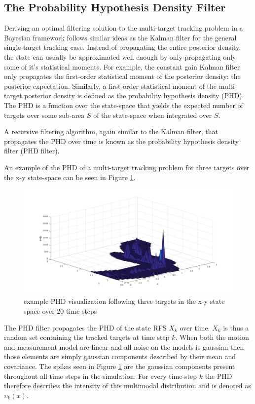 \subsection{The Probability Hypothesis Density Filter}

Deriving an optimal filtering solution to the multi-target tracking problem in a Bayesian framework follows similar ideas as the Kalman filter for the general single-target tracking case. Instead of propagating the entire posterior density, the state can usually be approximated well enough by only propagating only some of it's statistical moments. For example, the constant gain Kalman filter only propagates the first-order statistical moment of the posterior density: the posterior expectation. Similarly, a first-order statistical moment of the multi-target posterior density is defined as the probability hypothesis density (PHD). The PHD is a function over the state-space that yields the expected number of targets over some sub-area $S$ of the state-space when integrated over $S$.\cite{mahler2003multitarget}

A recursive filtering algorithm, again similar to the Kalman filter, that propagates the PHD over time is known as the probability hypothesis density filter (PHD filter).

An example of the PHD of a multi-target tracking problem for three targets over the x-y state-space can be seen in Figure \ref{fig:phd_example}.

\begin{figure}[H]
\centering
\includegraphics[width=0.8\linewidth]{include/images/phd_example.png}
\caption{example PHD visualization following three targets in the x-y state space over 20 time steps}
\label{fig:phd_example}
\end{figure}

The PHD filter propagates the PHD of the state RFS $X_k$ over time. $X_k$ is thus a random set containing the tracked targets at time step $k$. When both the motion and measurement model are linear and all noise on the models is gaussian then those elements are simply gaussian components described by their mean and covariance. The spikes seen in Figure \ref{fig:phd_example} are the gaussian components present throughout all time steps in the simulation. For every time-step $k$ the PHD therefore describes the intensity of this multimodal distribution and is denoted as $\upsilon_k(x)$.

